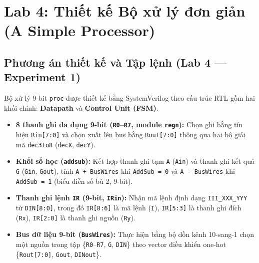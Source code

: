 \documentclass[11pt,a4paper]{article}
\newcommand{\code}[1]{\texttt{\small #1}}
\begin{document}
\newpage

\section{Lab 4: Thiết kế Bộ xử lý đơn giản (A Simple Processor)}

\subsection{Phương án thiết kế và Tập lệnh (Lab 4 --- Experiment 1)}
Bộ xử lý 9-bit \code{proc} được thiết kế bằng SystemVerilog theo cấu trúc RTL gồm hai khối chính: \textbf{Datapath} và \textbf{Control Unit (FSM)}.
\begin{itemize}
  \item \textbf{8 thanh ghi đa dụng 9-bit (\code{R0}--\code{R7}, module \code{regn}):} Chọn ghi bằng tín hiệu \code{Rin[7:0]} và chọn xuất lên bus bằng \code{Rout[7:0]} thông qua hai bộ giải mã \code{dec3to8} (\code{decX}, \code{decY}).
  \item \textbf{Khối số học (\code{addsub}):} Kết hợp thanh ghi tạm \code{A} (\code{Ain}) và thanh ghi kết quả \code{G} (\code{Gin}, \code{Gout}), tính \code{A + BusWires} khi \code{AddSub = 0} và \code{A - BusWires} khi \code{AddSub = 1} (biểu diễn số bù 2, 9-bit).
  \item \textbf{Thanh ghi lệnh \code{IR} (9-bit, \code{IRin}):} Nhận mã lệnh định dạng \code{III\_XXX\_YYY} từ \code{DIN[8:0]}, trong đó \code{IR[8:6]} là mã lệnh (\code{I}), \code{IR[5:3]} là thanh ghi đích (\code{Rx}), \code{IR[2:0]} là thanh ghi nguồn (\code{Ry}).
  \item \textbf{Bus dữ liệu 9-bit (\code{BusWires}):} Thực hiện bằng bộ dồn kênh 10-sang-1 chọn một nguồn trong tập \{\code{R0}--\code{R7}, \code{G}, \code{DIN}\} theo vector điều khiển one-hot \{\code{Rout[7:0]}, \code{Gout}, \code{DINout}\}.
\end{itemize}
\end{document}

